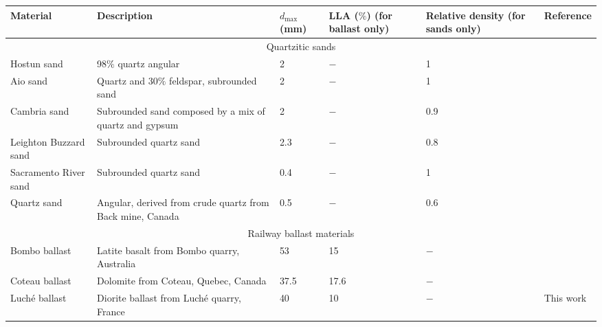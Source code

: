 \begin{table}[htb]
    \centering
    \small
    \label{table:1}
    \tabcolsep=0.1mm
    \begin{tabular}{p{}<{\raggedright} p{}<{\raggedright} p{}<{\centering} p{}<{\centering} p{}<{\centering} p{}<{\raggedright}}
        \toprule
        Material & Description & $d_{\max}$ (mm) & LLA ($\%$) (for ballast only) & Relative density (for sands only) & Reference \\
        \midrule
        \multicolumn{6}{c}{Quartzitic sands} \\
        Hostun sand & 98$\%$ quartz angular & 2 & $-$ & 1 & \citet{Biarez19941} \\
        Aio sand& Quartz and 30$\%$ feldspar,  subrounded sand & 2 & $-$ & 1 & \citet{Nakata1999567} \\
        Cambria sand & Subrounded sand composed by a mix of quartz and gypsum & 2 & $-$ & 0.9 & \citet{Yamamuro1996109} \\
        Leighton Buzzard sand & Subrounded quartz sand & 2.3 & $-$ & 0.8 & \citet{Lee1992} \\
        Sacramento River sand & Subrounded quartz sand & 0.4 & $-$ & 1 & \citet{Lee1967117} \\
        Quartz sand & Angular, derived from crude quartz from Back mine, Canada & 0.5 & $-$ & 0.6 & \citet{Lo197361} \\
        \multicolumn{6}{c}{Railway ballast materials} \\
        Bombo ballast & Latite basalt from Bombo quarry, Australia & 53 & 15 & $-$ & \citet{Indraratna1998439} \\
        Coteau ballast & Dolomite from Coteau, Quebec, Canada & 37.5 & 17.6 & $-$ & \citet{Raymond1978737} \\
        Luché ballast & Diorite ballast from Luché quarry, France & 40 & 10 & $-$ & This work \\
        \bottomrule
    \end{tabular}
\end{table}